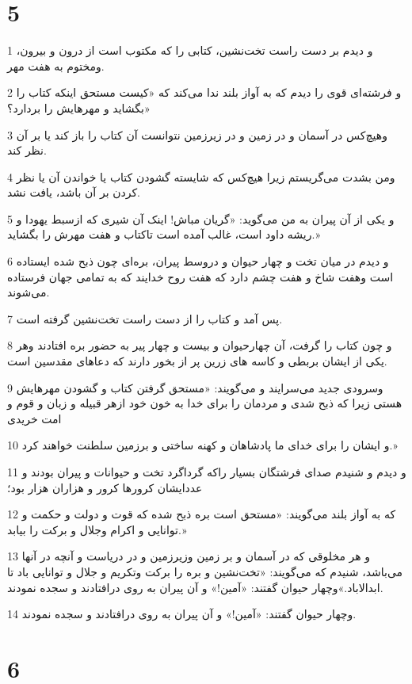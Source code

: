 \chapter{5}

\par 1 و دیدم بر دست راست تخت‌نشین، کتابی را که مکتوب است از درون و بیرون، ومختوم به هفت مهر.
\par 2 و فرشته‌ای قوی را دیدم که به آواز بلند ندا می‌کند که «کیست مستحق اینکه کتاب را بگشاید و مهرهایش را بردارد؟»
\par 3 وهیچ‌کس در آسمان و در زمین و در زیرزمین نتوانست آن کتاب را باز کند یا بر آن نظر کند.
\par 4 ومن بشدت می‌گریستم زیرا هیچ‌کس که شایسته گشودن کتاب یا خواندن آن یا نظر کردن بر آن باشد، یافت نشد.
\par 5 و یکی از آن پیران به من می‌گوید: «گریان مباش! اینک آن شیری که ازسبط یهودا و ریشه داود است، غالب آمده است تاکتاب و هفت مهرش را بگشاید.»
\par 6 و دیدم در میان تخت و چهار حیوان و دروسط پیران، بره‌ای چون ذبح شده ایستاده است وهفت شاخ و هفت چشم دارد که هفت روح خدایند که به تمامی جهان فرستاده می‌شوند.
\par 7 پس آمد و کتاب را از دست راست تخت‌نشین گرفته است.
\par 8 و چون کتاب را گرفت، آن چهارحیوان و بیست و چهار پیر به حضور بره افتادند وهر یکی از ایشان بربطی و کاسه های زرین پر از بخور دارند که دعاهای مقدسین است.
\par 9 وسرودی جدید می‌سرایند و می‌گویند: «مستحق گرفتن کتاب و گشودن مهرهایش هستی زیرا که ذبح شدی و مردمان را برای خدا به خون خود ازهر قبیله و زبان و قوم و امت خریدی
\par 10 و ایشان را برای خدای ما پادشاهان و کهنه ساختی و برزمین سلطنت خواهند کرد.»
\par 11 و دیدم و شنیدم صدای فرشتگان بسیار راکه گرداگرد تخت و حیوانات و پیران بودند و عددایشان کرورها کرور و هزاران هزار بود؛
\par 12 که به آواز بلند می‌گویند: «مستحق است بره ذبح شده که قوت و دولت و حکمت و توانایی و اکرام وجلال و برکت را بیابد.»
\par 13 و هر مخلوقی که در آسمان و بر زمین وزیرزمین و در دریاست و آنچه در آنها می‌باشد، شنیدم که می‌گویند: «تخت‌نشین و بره را برکت وتکریم و جلال و توانایی باد تا ابدالاباد.»وچهار حیوان گفتند: «آمین!» و آن پیران به روی درافتادند و سجده نمودند.
\par 14 وچهار حیوان گفتند: «آمین!» و آن پیران به روی درافتادند و سجده نمودند.

\chapter{6}

